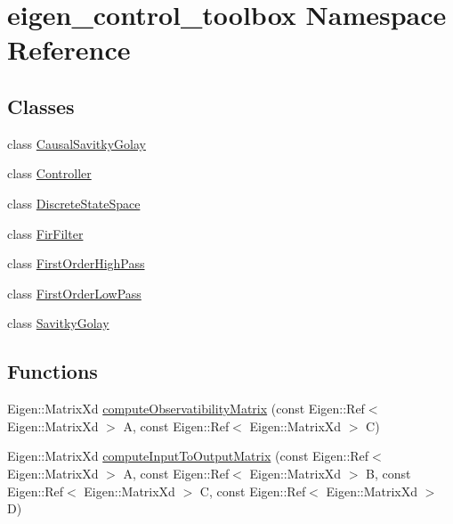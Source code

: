 \hypertarget{namespaceeigen__control__toolbox}{}\section{eigen\+\_\+control\+\_\+toolbox Namespace Reference}
\label{namespaceeigen__control__toolbox}
\subsection*{Classes}
\begin{DoxyCompactItemize}
\item 
class \hyperlink{classeigen__control__toolbox_1_1_causal_savitky_golay}{Causal\+Savitky\+Golay}
\item 
class \hyperlink{classeigen__control__toolbox_1_1_controller}{Controller}
\item 
class \hyperlink{classeigen__control__toolbox_1_1_discrete_state_space}{Discrete\+State\+Space}
\item 
class \hyperlink{classeigen__control__toolbox_1_1_fir_filter}{Fir\+Filter}
\item 
class \hyperlink{classeigen__control__toolbox_1_1_first_order_high_pass}{First\+Order\+High\+Pass}
\item 
class \hyperlink{classeigen__control__toolbox_1_1_first_order_low_pass}{First\+Order\+Low\+Pass}
\item 
class \hyperlink{classeigen__control__toolbox_1_1_savitky_golay}{Savitky\+Golay}
\end{DoxyCompactItemize}
\subsection*{Functions}
\begin{DoxyCompactItemize}
\item 
Eigen\+::\+Matrix\+Xd \hyperlink{namespaceeigen__control__toolbox_a86a3c3ab74553e088a86fd855157e2bb}{compute\+Observatibility\+Matrix} (const Eigen\+::\+Ref$<$ Eigen\+::\+Matrix\+Xd $>$ A, const Eigen\+::\+Ref$<$ Eigen\+::\+Matrix\+Xd $>$ C)
\item 
Eigen\+::\+Matrix\+Xd \hyperlink{namespaceeigen__control__toolbox_a620ee7eb85ebeea2ca6ec84f96a16ca4}{compute\+Input\+To\+Output\+Matrix} (const Eigen\+::\+Ref$<$ Eigen\+::\+Matrix\+Xd $>$ A, const Eigen\+::\+Ref$<$ Eigen\+::\+Matrix\+Xd $>$ B, const Eigen\+::\+Ref$<$ Eigen\+::\+Matrix\+Xd $>$ C, const Eigen\+::\+Ref$<$ Eigen\+::\+Matrix\+Xd $>$ D)
\end{DoxyCompactItemize}


